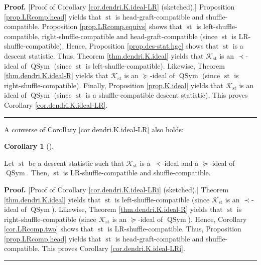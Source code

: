 \documentclass[numbers=enddot,12pt,final,onecolumn,notitlepage]{scrartcl}%
\theoremstyle{definition}
\newtheorem{coro}[theo]{Corollary}
\newenvironment{corollary}[1][]
{\begin{coro}[#1]\begin{leftbar}}
{\end{leftbar}\end{coro}}
\newenvironment{proof}[1][Proof]{\noindent\textbf{#1.} }{\ \rule{0.5em}{0.5em}}
\newenvironment{verlong}{}{}
\begin{document}
\begin{verlong}
\begin{proof}
[Proof of Corollary \ref{cor.dendri.K.ideal-LR} (sketched).] Proposition
\ref{prop.LRcomp.head} yields that $\operatorname*{st}$ is
head-graft-compatible and shuffle-compatible. Proposition
\ref{prop.LRcomp.equivs} shows that $\operatorname*{st}$ is
left-shuffle-compatible, right-shuffle-compatible and head-graft-compatible
(since $\operatorname*{st}$ is LR-shuffle-compatible). Hence, Proposition
\ref{prop.des-stat.hgc} shows that $\operatorname*{st}$ is a descent
statistic. Thus, Theorem \ref{thm.dendri.K.ideal} yields that $\mathcal{K}%
_{\operatorname*{st}}$ is an $\left.  \prec\right.  $-ideal of
$\operatorname*{QSym}$ (since $\operatorname*{st}$ is
left-shuffle-compatible). Likewise, Theorem \ref{thm.dendri.K.ideal-R} yields
that $\mathcal{K}_{\operatorname*{st}}$ is an $\left.  \succeq\right.  $-ideal
of $\operatorname*{QSym}$ (since $\operatorname*{st}$ is
right-shuffle-compatible). Finally, Proposition \ref{prop.K.ideal} yields that
$\mathcal{K}_{\operatorname*{st}}$ is an ideal of $\operatorname*{QSym}$
(since $\operatorname*{st}$ is a shuffle-compatible descent statistic). This
proves Corollary \ref{cor.dendri.K.ideal-LR}.
\end{proof}

A converse of Corollary \ref{cor.dendri.K.ideal-LR} also holds:

\begin{corollary}
\label{cor.dendri.K.ideal-LRi}Let $\operatorname*{st}$ be a descent statistic
such that $\mathcal{K}_{\operatorname*{st}}$ is a $\left.  \prec\right.
$-ideal and a $\left.  \succeq\right.  $-ideal of $\operatorname*{QSym}$.
Then, $\operatorname*{st}$ is LR-shuffle-compatible and shuffle-compatible.
\end{corollary}

\begin{proof}
[Proof of Corollary \ref{cor.dendri.K.ideal-LRi} (sketched).] Theorem
\ref{thm.dendri.K.ideal} yields that $\operatorname*{st}$ is
left-shuffle-compatible (since $\mathcal{K}_{\operatorname*{st}}$ is an
$\left.  \prec\right.  $-ideal of $\operatorname*{QSym}$). Likewise, Theorem
\ref{thm.dendri.K.ideal-R} yields that $\operatorname*{st}$ is
right-shuffle-compatible (since $\mathcal{K}_{\operatorname*{st}}$ is an
$\left.  \succeq\right.  $-ideal of $\operatorname*{QSym}$). Hence, Corollary
\ref{cor.LRcomp.two} shows that $\operatorname*{st}$ is LR-shuffle-compatible.
Thus, Proposition \ref{prop.LRcomp.head} yields that $\operatorname*{st}$ is
head-graft-compatible and shuffle-compatible. This proves Corollary
\ref{cor.dendri.K.ideal-LRi}.
\end{proof}


\end{verlong}
\end{document}
